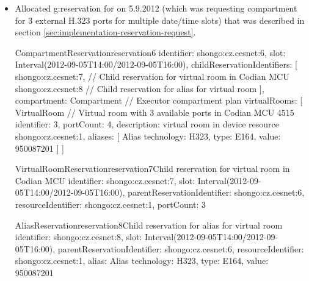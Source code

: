 \begin{itemize}
\begin{ObjectCode}{VirtualRoomReservation}{reservation4}{Child reservation for virtual room in Codian MCU}
identifier: shongo:cz.cesnet:4,
slot: Interval(2012-10-12T14:00/2012-10-12T16:00),
parentReservationIdentifier: shongo:cz.cesnet:2,
resourceIdentifier: shongo:cz.cesnet:1,
portCount: 4
\end{ObjectCode}
\begin{ObjectCode}{AliasReservation}{reservation5}{Child reservation for alias for virtual room}
identifier: shongo:cz.cesnet:5,
slot: Interval(2012-10-12T14:00/2012-10-12T16:00),
parentReservationIdentifier: shongo:cz.cesnet:2,
resourceIdentifier: shongo:cz.cesnet:1,
alias: Alias { technology: H323, type: E164, value: 950087201 }
\end{ObjectCode}

\item Allocated \gls{g:reservation} for \hyperref[oc:request3]{} on 5.9.2012 (which was requesting compartment for 3 external H.323 ports for multiple date/time slots) that was described in section \ref{sec:implementation-reservation-request}.
\begin{ObjectCode}{CompartmentReservation}{reservation6}{}
identifier: shongo:cz.cesnet:6,
slot: Interval(2012-09-05T14:00/2012-09-05T16:00),
childReservationIdentifiers: [
  shongo:cz.cesnet:7, // Child reservation for virtual room in Codian MCU
  shongo:cz.cesnet:8  // Child reservation for alias for virtual room
],
compartment: Compartment { // Executor compartment plan  
  virtualRooms: [
    VirtualRoom { // Virtual room with 3 available ports in Codian MCU 4515
      identifier: 3,
      portCount: 4,
      description: virtual room in device resource shongo:cz.cesnet:1,      
      aliases: [
        Alias { technology: H323, type: E164, value: 950087201 }
      ]
    }
  ]
}
\end{ObjectCode}
\begin{ObjectCode}{VirtualRoomReservation}{reservation7}{Child reservation for virtual room in Codian MCU}
identifier: shongo:cz.cesnet:7,
slot: Interval(2012-09-05T14:00/2012-09-05T16:00),
parentReservationIdentifier: shongo:cz.cesnet:6,
resourceIdentifier: shongo:cz.cesnet:1,
portCount: 3
\end{ObjectCode}
\begin{ObjectCode}{AliasReservation}{reservation8}{Child reservation for alias for virtual room}
identifier: shongo:cz.cesnet:8,
slot: Interval(2012-09-05T14:00/2012-09-05T16:00),
parentReservationIdentifier: shongo:cz.cesnet:6,
resourceIdentifier: shongo:cz.cesnet:1,
alias: Alias { technology: H323, type: E164, value: 950087201 }
\end{ObjectCode}


\end{itemize}
